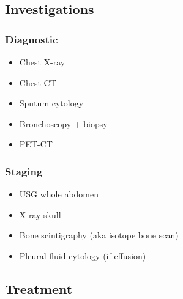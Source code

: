 \documentclass[
  14pt,
]{extarticle}
\providecommand{\tightlist}{%
  \setlength{\itemsep}{0pt}\setlength{\parskip}{0pt}}
\begin{document}
\hypertarget{investigations}{%
\subsection{Investigations}\label{investigations}}

\hypertarget{diagnostic}{%
\subsubsection{Diagnostic}\label{diagnostic}}

\begin{itemize}
\tightlist
\item
  Chest X-ray
\item
  Chest CT
\item
  Sputum cytology
\item
  Bronchoscopy + biopsy
\item
  PET-CT
\end{itemize}

\hypertarget{staging}{%
\subsubsection{Staging}\label{staging}}

\begin{itemize}
\tightlist
\item
  USG whole abdomen
\item
  X-ray skull
\item
  Bone scintigraphy (aka isotope bone scan)
\item
  Pleural fluid cytology (if effusion)
\end{itemize}

\hypertarget{treatment}{%
\subsection{Treatment}\label{treatment}}
\end{document}
